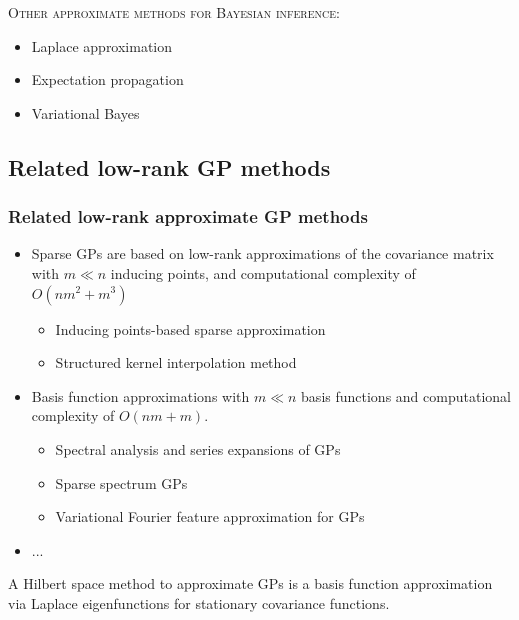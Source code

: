 \documentclass[8pt]{beamer} %
\begin{document}
\begin{frame}

\textsc{\small Other approximate methods for Bayesian inference:}
\begin{itemize}\setlength\itemsep{2mm}
\item {\color{navyblue} Laplace approximation}
\item {\color{navyblue} Expectation propagation}
\item {\color{navyblue} Variational Bayes}
\end{itemize}
\end{frame}


\subsection*{Related low-rank GP methods}
\begin{frame}\frametitle{\normalsize Related low-rank approximate GP methods}

\begin{itemize}\setlength\itemsep{2mm}
\item {\color{navyblue} Sparse GPs} are based on low-rank approximations of the covariance matrix with $m \ll n$ inducing points, and computational complexity of $O(nm^2 + m^3)$ \\[1mm]
	\begin{itemize}\setlength\itemsep{2mm}
		\item Inducing points-based sparse approximation
		\item Structured kernel interpolation method
	\end{itemize}

\item {\color{navyblue} Basis function approximations} with $m \ll n$ basis functions and computational complexity of $O(nm+m)$.\\[1mm]
	\begin{itemize}\setlength\itemsep{2mm}
	\item Spectral analysis and series expansions of GPs
	\item Sparse spectrum GPs
	\item Variational Fourier feature approximation for GPs
	\end{itemize}
	
\item ...

\end{itemize}

\centering
\begin{tcolorbox}[boxrule=0.5pt,colframe=blue!20, colback=blue!5]
A Hilbert space method to approximate GPs is a {\color{navyblue} basis function approximation via Laplace eigenfunctions} for stationary covariance functions.
\end{tcolorbox}
\end{frame}
\end{document}
